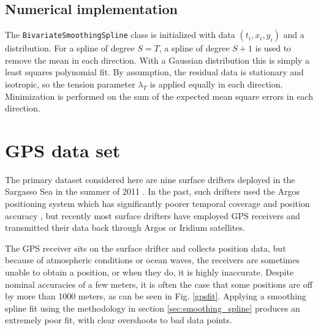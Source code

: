 \documentclass{ametsoc}
\begin{document}
\subsection{Numerical implementation}

The \texttt{BivariateSmoothingSpline} class is initialized with data $(t_i, x_i, y_i)$ and a distribution. For a spline of degree $S=T$, a spline of degree $S+1$ is used to remove the mean in each direction. With a Gaussian distribution this is simply a least squares polynomial fit. By assumption, the residual data is stationary and isotropic, so the tension parameter $\lambda_T$ is applied equally in each direction. Minimization is performed on the sum of the expected mean square errors in each direction.

\section{GPS data set}
\label{sec:drifter_data_set}


The primary dataset considered here are nine surface drifters deployed in the Sargasso Sea in the summer of 2011 \citep{shcherbina2015-bams}. 
In the past, such drifters used the Argos positioning system which has significantly poorer temporal coverage and position accuracy \citep{elipot2016-jgr}, but recently most surface drifters have employed GPS receivers and transmitted their data back through Argos or Iridium satellites.

The GPS receiver sits on the surface drifter and collects position data, but because of atmospheric conditions or ocean waves, the receivers are sometimes unable to obtain a position, or when they do, it is highly inaccurate. Despite nominal accuracies of a few meters, it is often the case that some positions are off by more than 1000 meters, as can be seen in Fig. \ref{gpsfit}. Applying a smoothing spline fit using the methodology in section \ref{sec:smoothing_spline} produces an extremely poor fit, with clear overshoots to bad data points.
\end{document}

